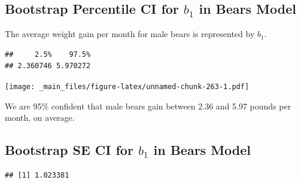 \documentclass[]{book}
\newenvironment{Shaded}{\begin{snugshade}}{\end{snugshade}}
\newcommand{\KeywordTok}[1]{\textcolor[rgb]{0.13,0.29,0.53}{\textbf{#1}}}
\newcommand{\DecValTok}[1]{\textcolor[rgb]{0.00,0.00,0.81}{#1}}
\newcommand{\FloatTok}[1]{\textcolor[rgb]{0.00,0.00,0.81}{#1}}
\newcommand{\StringTok}[1]{\textcolor[rgb]{0.31,0.60,0.02}{#1}}
\newcommand{\OperatorTok}[1]{\textcolor[rgb]{0.81,0.36,0.00}{\textbf{#1}}}
\newcommand{\NormalTok}[1]{#1}
\begin{document}
\subsection{\texorpdfstring{Bootstrap Percentile CI for \(b_1\) in Bears
Model}{Bootstrap Percentile CI for b\_1 in Bears Model}}\label{bootstrap-percentile-ci-for-b_1-in-bears-model}

The average weight gain per month for male bears is represented by
\(b_1\).

\begin{Shaded}
\end{Shaded}

\begin{verbatim}
##     2.5%    97.5% 
## 2.360746 5.970272
\end{verbatim}

\texttt{[image: \_main\_files/figure-latex/unnamed-chunk-263-1.pdf]}

We are 95\% confident that male bears gain between 2.36 and 5.97 pounds
per month, on average.

\subsection{\texorpdfstring{Bootstrap SE CI for \(b_1\) in Bears
Model}{Bootstrap SE CI for b\_1 in Bears Model}}\label{bootstrap-se-ci-for-b_1-in-bears-model}

\begin{Shaded}
\end{Shaded}

\begin{verbatim}
## [1] 1.023381
\end{verbatim}
\end{document}
